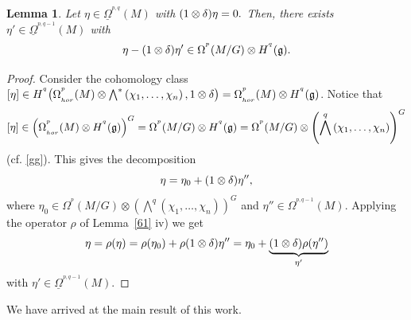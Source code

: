 \documentclass[a4paper,oneside,10pt,reqno]{amsart}
\newtheorem{lemma}[theorem]{Lemma}
\theoremstyle{definition}
\newcommand{\lemref}[1]{Lemma~\ref{#1}}
\newcommand{\g}{\noindent {\mathfrak{g}}}
\newcommand\Om{\Omega}
\newcommand\BOm{\underline\Omega}
\newcommand{\id}{{\large 1}}
\newcommand{\lau}[4]{{#1}^{^{#2}}_{_{#3}}{\left( #4 \right)}}
\newcommand{\coho}[3]{{#1}^{^{#2}}{\left( #3 \right)}}
\begin{document}
 
\begin{lemma}\label{not45}
Let  $\eta \in \coho {\BOm} {p,q} M$ with $(\id \otimes \delta) \eta =0.$
Then, there exists $\eta' \in \coho {\BOm} {p,q-1} M$ with  $$\eta -(\id \otimes \delta)\eta' \in \coho \Om p {M/G} \otimes \coho H q \g.$$
\end{lemma}
\begin{proof} 
Consider the cohomology class
$[\eta ] \in  \coho H q 
{ 
\lau \Om p {hor} M \otimes  \bigwedge^* \left(\chi_1, \ldots, \chi_n\right), \id \otimes \delta
}
=
\lau \Om p {hor} M\otimes \coho H q  \g
 $. 
 Notice that 
 \begin{equation}\label{kkbb}
 [\eta]\in 
 \left(
 \lau \Om p {hor} M\otimes \coho H q \g
  \right)^G 
  =
   \coho {\Om} p {M/G} \otimes \coho H q {\g} 
   = \coho \Om p {M/G} \otimes \left(\bigwedge^q \left(\chi_1, \ldots, \chi_n\right)\right)^G
 \end{equation}
  (cf. {\eqref{gg}}). This gives the decomposition
 $$
 \eta = \eta_0 + (\id \otimes \delta) \eta'',
 $$
where  $\eta_0 \in \coho \Om p {M/G} \otimes \left(\bigwedge^q \left(\chi_1, \ldots, \chi_n\right)\right)^G$  and 
$\eta'' \in  \lau  \Om {p,q-1} {} M$. Applying the operator $\rho$ of \lemref{61} iv) we get
 $$
 \eta = \rho(\eta)  = \rho(\eta_0)  + \rho (\id \otimes \delta) \eta'' =  \eta_0   + \underbrace{(\id \otimes \delta)  \rho( \eta''  )}_{\eta'}
 $$
with $\eta' \in  \coho {\BOm} {p,q-1} M$.
 \end{proof}

  
We have arrived at the main result of this work.
\end{document}
